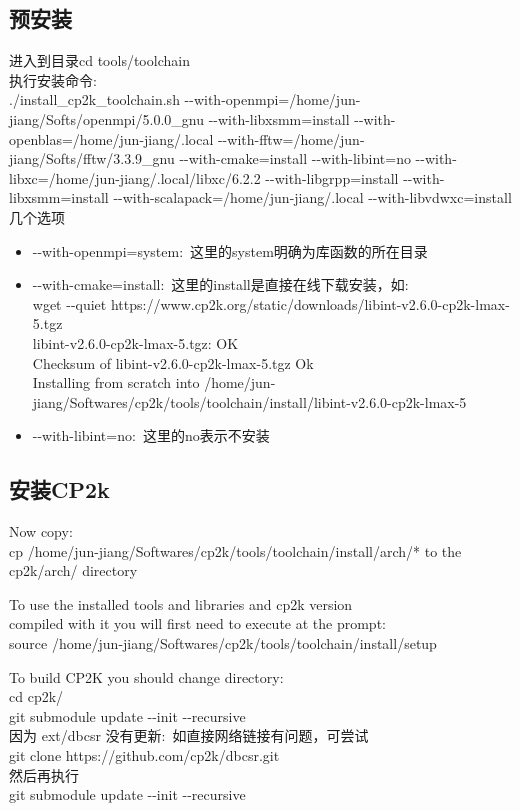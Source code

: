 \documentclass[10pt,a4paper]{article}
\begin{document}
\subsection{预安装}
进入到目录\textrm{cd tools/toolchain}\\
执行安装命令:\\
\textrm{./install\_cp2k\_toolchain.sh  -\/-with-openmpi=/home/jun-jiang/Softs/openmpi/5.0.0\_gnu -\/-with-libxsmm=install -\/-with-openblas=/home/jun-jiang/.local -\/-with-fftw=/home/jun-jiang/Softs/fftw/3.3.9\_gnu -\/-with-cmake=install -\/-with-libint=no -\/-with-libxc=/home/jun-jiang/.local/libxc/6.2.2 -\/-with-libgrpp=install -\/-with-libxsmm=install -\/-with-scalapack=/home/jun-jiang/.local -\/-with-libvdwxc=install}\\
几个选项
\begin{itemize}
	\item \textrm{-\/-with-openmpi=system}:~这里的\textrm{system}明确为库函数的所在目录
	\item \textrm{-\/-with-cmake=install}:~这里的\textrm{install}是直接在线下载安装，如:\\
		\textrm{wget -\/-quiet https://www.cp2k.org/static/downloads/libint-v2.6.0-cp2k-lmax-5.tgz}\\
		\textrm{libint-v2.6.0-cp2k-lmax-5.tgz: OK}\\
		\textrm{Checksum of libint-v2.6.0-cp2k-lmax-5.tgz Ok}\\
\textrm{Installing from scratch into /home/jun-jiang/Softwares/cp2k/tools/toolchain/install/libint-v2.6.0-cp2k-lmax-5}
	\item \textrm{-\/-with-libint=no}:~这里的\textrm{no}表示不安装
\end{itemize}
\subsection{安装\rm{CP2k}}
\textrm{Now copy:\\
cp /home/jun-jiang/Softwares/cp2k/tools/toolchain/install/arch/* to the cp2k/arch/ directory}
 
\textrm{To use the installed tools and libraries and cp2k version\\
compiled with it you will first need to execute at the prompt:\\
  source /home/jun-jiang/Softwares/cp2k/tools/toolchain/install/setup}

\textrm{To build CP2K you should change directory:\\
cd cp2k/}\\
\textrm{git submodule update -\/-init -\/-recursive}\\
因为 \textrm{ext/dbcsr} 没有更新:~如直接网络链接有问题，可尝试\\
\textrm{git clone https://github.com/cp2k/dbcsr.git}\\
然后再执行\\
\textrm{git submodule update -\/-init -\/-recursive}\\
\end{document}
